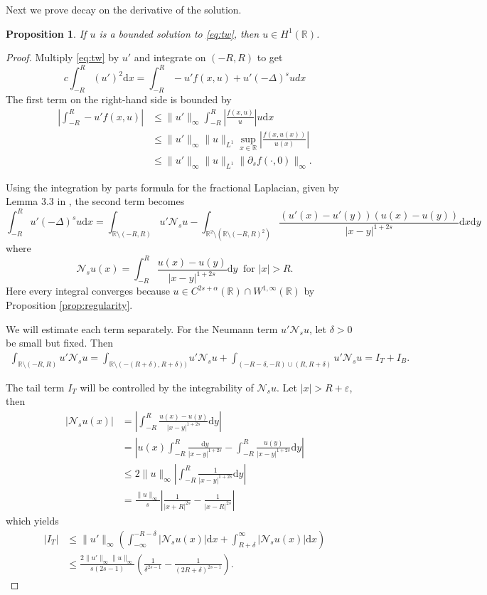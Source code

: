 \documentclass[11pt,a4paper]{amsart}
\newcommand{\R}{\mathbb{R}}
\newcommand{\Ns}{\mathcal{N}_s}
\newcommand{\dx}{\mathrm{d}x}
\newcommand{\dy}{\mathrm{d}y}
\renewcommand{\epsilon}{\varepsilon}
\newtheorem{prop}[thm]{Proposition}
\begin{document}
Next we prove decay on the derivative of the solution.

\begin{prop}
\label{prop:H1}
If $u$ is a bounded solution to \eqref{eq:tw}, then $u \in H^1(\R)$.
\end{prop}

\begin{proof}
Multiply \eqref{eq:tw} by $u'$ and integrate on $(-R,R)$ to get
\[c\int_{-R}^R (u')^2 \dx = \int_{-R}^R - u'f(x,u) + u'(-\Delta)^su dx\]
The first term on the right-hand side is bounded by
\begin{align*}
\left|\int_{-R}^R - u'f(x,u) \right| &\leq \|u'\|_{\infty} \int_{-R}^R \left|\frac{f(x,u)}{u}\right| u\dx \\
&\leq \|u'\|_{\infty} \|u\|_{L^1} \sup_{x\in \R} \left|\frac{f(x,u(x))}{u(x)}\right| \\
&\leq \|u'\|_{\infty} \|u\|_{L^1} \|\partial_s f(\cdot, 0)\|_{\infty}.
\end{align*}

Using the integration by parts formula for the fractional Laplacian, given by Lemma 3.3 in \cite{DRV17}, the second term becomes 
\begin{equation}
\label{eq:ipp}
\int_{-R}^R u'(-\Delta)^s u\dx = \int_{\R \setminus (-R,R)} u' \Ns u - \int_{\R^2 \setminus (\R \setminus (-R,R)^2)} \frac{(u'(x) - u'(y)) (u(x) - u(y))}{|x - y|^{1+2s}}\dx \dy
\end{equation}
where 
\[\Ns u (x) = \int_{-R}^R \frac{u(x)-u(y)}{|x-y|^{1+2s}} \dy ~\text{ for }|x| > R. \]
Here every integral converges because $u\in C^{2s+\alpha}(\R) \cap W^{1,\infty}(\R)$ by Proposition \ref{prop:regularity}. 

We will estimate each term separately. For the Neumann term  $u'\Ns u$, let $\delta > 0$ be small but fixed. Then
\begin{align*}
\int_{\R \setminus (-R,R)} u' \Ns u  = \int_{\R \setminus (-(R+\delta), R+\delta))} u' \Ns u + \int_{(-R-\delta, -R) \cup (R, R+\delta)} u'\Ns u = I_T + I_B.
\end{align*}

The tail term $I_T$ will be controlled by the integrability of $\Ns u$. Let $|x| > R+ \epsilon$, then
\begin{align*}
|\Ns u(x)| &= \left|\int_{-R}^R \frac{u(x) - u(y)}{|x-y|^{1+2s}} \dy \right| \\
&= \left|u(x) \int_{-R}^R \frac{\dy}{|x-y|^{1+2s}} - \int_{-R}^R \frac{u(y)}{|x-y|^{1+2s}} \dy \right|\\
&\leq 2\|u\|_{\infty} \left| \int_{-R}^R \frac{1}{|x-y|^{1+2s}} \dy \right| \\
&= \frac{\|u\|_{\infty}}{s} \left| \frac{1}{|x+R|^{2s}} - \frac{1}{|x-R|^{2s}} \right|
\end{align*}
which yields
\begin{align*}
\left|I_T \right| &\leq \|u'\|_{{\infty}} \left( \int_{-\infty}^{-R-\delta} |\Ns u(x)| \dx +\int_{R+\delta}^{\infty} |\Ns u(x)| \dx \right) \\
&\leq \frac{2\|u'\|_{\infty} \|u\|_{\infty}}{s(2s-1)}\left(\frac{1}{\delta^{2s-1}} - \frac{1}{(2R + \delta)^{2s-1}} \right).
\end{align*}


\end{proof}
\end{document}
